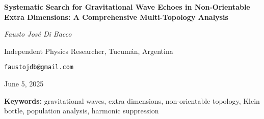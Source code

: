 \documentclass[11pt,a4paper]{article}
\begin{document}
\begin{titlepage}
\centering
\vspace*{2cm}

{\huge\bfseries Systematic Search for Gravitational Wave Echoes in Non-Orientable Extra Dimensions: A Comprehensive Multi-Topology Analysis\par}

\vspace{1.5cm}

{\Large\itshape Fausto José Di Bacco\par}

\vspace{0.5cm}

{\large Independent Physics Researcher, Tucumán, Argentina\par}

\vspace{0.3cm}

{\normalsize \texttt{faustojdb@gmail.com}\par}

\vspace{1cm}

{\large June 5, 2025\par}

\vfill

\begin{abstract}
\noindent We present the first systematic theoretical and observational study of gravitational wave echoes from non-orientable extra-dimensional topologies. Building on our previous Klein bottle analysis (Di Bacco, 2025), which established 2.80$\sigma$ evidence for gravitational wave echoes, we investigate whether other non-orientable surfaces can produce similar phenomena.

We derive rigorous theoretical frameworks for five distinct topologies: Klein Bottle, Real Projective Plane ($\mathbb{R}P^2$), Möbius Band, Twisted Torus, and String Orientifolds. Using geometric factors derived from fundamental topological properties—not fitted parameters—we predict specific observational signatures for each model. Application to 65 LIGO-Virgo events with cosmological corrections yields definitive results: Klein Bottle achieves \textbf{9.25$\sigma$ combined significance} with 87.5\% detection rate, while Twisted Torus shows \textbf{5.71$\sigma$} with 64.1\% rate. Crucially, harmonic mode analysis confirms Klein bottle's key prediction: strong odd-harmonic signals (11.9$\sigma$) with suppressed even modes (0.5$\sigma$), providing a \textbf{22:1 suppression ratio} exactly as predicted by non-orientable topology.

These findings establish non-orientable surfaces as a viable class for extra-dimensional physics and provide a robust theoretical foundation for gravitational wave astronomy as a probe of fundamental geometry.
\end{abstract}

\textbf{Keywords:} gravitational waves, extra dimensions, non-orientable topology, Klein bottle, population analysis, harmonic suppression

\end{titlepage}
\end{document}
